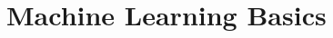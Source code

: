 \documentclass[11pt, twocolumn]{report}
\begin{document}
\setcounter{chapter}{4}
\chapter{Machine Learning Basics}
\end{document}
